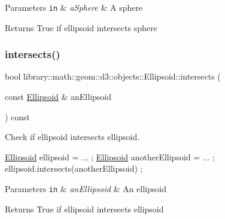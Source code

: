 \begin{DoxyParams}[1]{Parameters}
\mbox{\tt in}  & {\em a\+Sphere} & A sphere \\
\hline
\end{DoxyParams}
\begin{DoxyReturn}{Returns}
True if ellipsoid intersects sphere 
\end{DoxyReturn}
\mbox{\label{classlibrary_1_1math_1_1geom_1_1d3_1_1objects_1_1_ellipsoid_a4dfd1a3feba0ebed8a5adf89120ce53c}} 
\subsubsection{\texorpdfstring{intersects()}{intersects()}\hspace{0.1cm}{\footnotesize\ttfamily [8/9]}}
{\footnotesize\ttfamily bool library\+::math\+::geom\+::d3\+::objects\+::\+Ellipsoid\+::intersects (\begin{DoxyParamCaption}\item[{const \hyperlink{classlibrary_1_1math_1_1geom_1_1d3_1_1objects_1_1_ellipsoid}{Ellipsoid} \&}]{an\+Ellipsoid }\end{DoxyParamCaption}) const}



Check if ellipsoid intersects ellipsoid. 


\begin{DoxyCode}
\hyperlink{classlibrary_1_1math_1_1geom_1_1d3_1_1objects_1_1_ellipsoid_aae81fe0edc7f0e8d4590ea89ae73cb14}{Ellipsoid} ellipsoid = ... ;
\hyperlink{classlibrary_1_1math_1_1geom_1_1d3_1_1objects_1_1_ellipsoid_aae81fe0edc7f0e8d4590ea89ae73cb14}{Ellipsoid} anotherEllipsoid = ... ;
ellipsoid.intersects(anotherEllipsoid) ;
\end{DoxyCode}



\begin{DoxyParams}[1]{Parameters}
\mbox{\tt in}  & {\em an\+Ellipsoid} & An ellipsoid \\
\hline
\end{DoxyParams}
\begin{DoxyReturn}{Returns}
True if ellipsoid intersects ellipsoid 
\end{DoxyReturn}
\mbox{\label{classlibrary_1_1math_1_1geom_1_1d3_1_1objects_1_1_ellipsoid_a05dc13a49a72cb23046ff5735072765b}} 
